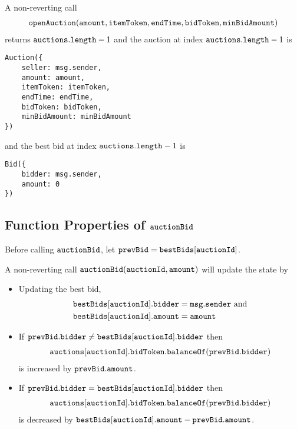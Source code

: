 \documentclass[a4paper,10pt]{article}
\begin{document}
A non-reverting call
\begin{align*}
\texttt{openAuction}(\texttt{amount}, \texttt{itemToken}, \texttt{endTime}, \texttt{bidToken}, \texttt{minBidAmount})
\end{align*}
returns $\texttt{auctions}.\texttt{length}-1$ and the auction at index $\texttt{auctions}.\texttt{length}-1$ is

\begin{lstlisting}
Auction({
    seller: msg.sender,
    amount: amount,
    itemToken: itemToken,
    endTime: endTime,
    bidToken: bidToken,
    minBidAmount: minBidAmount
})
\end{lstlisting}
and the best bid at index $\texttt{auctions}.\texttt{length}-1$ is
\begin{lstlisting}
Bid({
    bidder: msg.sender,
    amount: 0
})
\end{lstlisting}

\subsection*{Function Properties of $\texttt{auctionBid}$}

Before calling $\texttt{auctionBid}$, let $\texttt{prevBid} = \texttt{bestBids}[\texttt{auctionId}]$.

A non-reverting
call $\texttt{auctionBid}(\texttt{auctionId}, \texttt{amount})$ will update the state by
\begin{itemize}
\item Updating the best bid,
\begin{align*}
&\text{$\texttt{bestBids}[\texttt{auctionId}].\texttt{bidder} = \texttt{msg}.\texttt{sender}$ and} \\
&\text{$\texttt{bestBids}[\texttt{auctionId}].\texttt{amount} = \texttt{amount}$}
\end{align*}

\item If $\texttt{prevBid}.\texttt{bidder} \ne \texttt{bestBids}[\texttt{auctionId}].\texttt{bidder}$ then
\begin{align*}
\texttt{auctions}[\texttt{auctionId}].\texttt{bidToken}.\texttt{balanceOf}(\texttt{prevBid}.\texttt{bidder})
\end{align*}
is increased by
$\texttt{prevBid}.\texttt{amount}$.

\item If $\texttt{prevBid}.\texttt{bidder} = \texttt{bestBids}[\texttt{auctionId}].\texttt{bidder}$ then
\begin{align*}
\texttt{auctions}[\texttt{auctionId}].\texttt{bidToken}.\texttt{balanceOf}(\texttt{prevBid}.\texttt{bidder})
\end{align*}
is decreased by $\texttt{bestBids}[\texttt{auctionId}].\texttt{amount} - \texttt{prevBid}.\texttt{amount}$.
\end{itemize}
\end{document}
